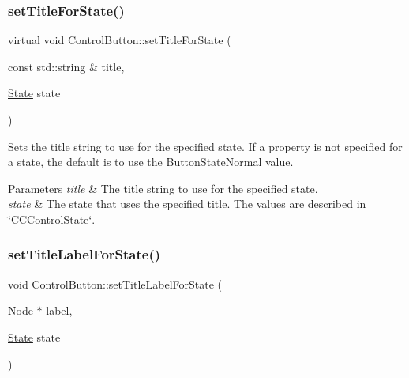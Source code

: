 \subsubsection{\texorpdfstring{set\+Title\+For\+State()}{setTitleForState()}\hspace{0.1cm}{\footnotesize\ttfamily [2/2]}}
{\footnotesize\ttfamily virtual void Control\+Button\+::set\+Title\+For\+State (\begin{DoxyParamCaption}\item[{const std\+::string \&}]{title,  }\item[{\hyperlink{classControl_a89e9598cd785841ac91cff3c4798c469}{State}}]{state }\end{DoxyParamCaption})\hspace{0.3cm}{\ttfamily [virtual]}}

Sets the title string to use for the specified state. If a property is not specified for a state, the default is to use the Button\+State\+Normal value.


\begin{DoxyParams}{Parameters}
{\em title} & The title string to use for the specified state. \\
\hline
{\em state} & The state that uses the specified title. The values are described in \char`\"{}\+C\+C\+Control\+State\char`\"{}. \\
\hline
\end{DoxyParams}
\mbox{\label{classControlButton_a1272d48903682b8c4bc088e35c6ac370}} 
\subsubsection{\texorpdfstring{set\+Title\+Label\+For\+State()}{setTitleLabelForState()}\hspace{0.1cm}{\footnotesize\ttfamily [1/2]}}
{\footnotesize\ttfamily void Control\+Button\+::set\+Title\+Label\+For\+State (\begin{DoxyParamCaption}\item[{\hyperlink{classNode}{Node} $\ast$}]{label,  }\item[{\hyperlink{classControl_a89e9598cd785841ac91cff3c4798c469}{State}}]{state }\end{DoxyParamCaption})\hspace{0.3cm}{\ttfamily [virtual]}}

